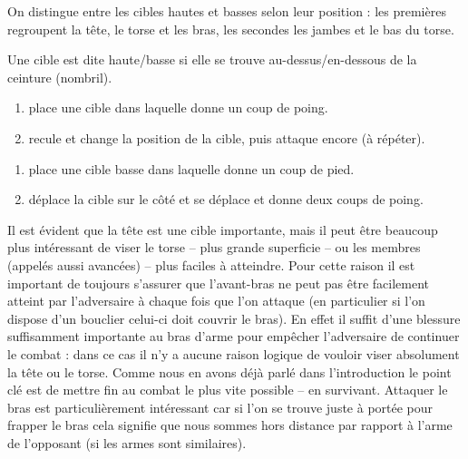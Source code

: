 On distingue entre les cibles hautes et basses selon leur position : les premières regroupent la tête, le torse et les bras, les secondes les jambes et le bas du torse.


\begin{definition}

Une cible est dite haute/basse si elle se trouve au-dessus/en-dessous de la ceinture (nombril).
\end{definition}


\begin{exercice}
\begin{enumerate}
	\item \D place une cible dans laquelle \A donne un coup de poing.
	
	\item \D recule et change la position de la cible, puis \A attaque encore (à répéter).
\end{enumerate}
\end{exercice}


\begin{exercice}
\begin{enumerate}
	\item \D place une cible basse dans laquelle \A donne un coup de pied.
	
	\item \D déplace la cible sur le côté et \A se déplace et donne deux coups de poing.
\end{enumerate}
\end{exercice}


Il est évident que la tête est une cible importante, mais il peut être beaucoup plus intéressant de viser le torse -- plus grande superficie -- ou les membres (appelés aussi avancées) -- plus faciles à atteindre.
Pour cette raison il est important de toujours s'assurer que l'avant-bras ne peut pas être facilement atteint par l'adversaire à chaque fois que l'on attaque (en particulier si l'on dispose d'un bouclier celui-ci doit couvrir le bras).
En effet il suffit d'une blessure suffisamment importante au bras d'arme pour empêcher l'adversaire de continuer le combat : dans ce cas il n'y a aucune raison logique de vouloir viser absolument la tête ou le torse.
Comme nous en avons déjà parlé dans l'introduction le point clé est de mettre fin au combat le plus vite possible -- en survivant.
Attaquer le bras est particulièrement intéressant car si l'on se trouve juste à portée pour frapper le bras cela signifie que nous sommes hors distance par rapport à l'arme de l'opposant (si les armes sont similaires).


